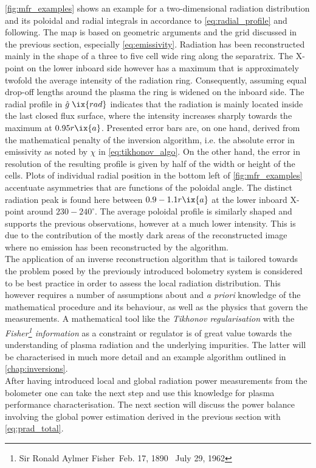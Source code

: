                 \autoref{fig:mfr_examples} shows an example for a two-dimensional radiation distribution and its poloidal and radial integrals in accordance to \cref{eq:radial_profile} and following. The map is based on geometric arguments and the grid discussed in the previous section, especially \cref{eq:emissivity}. Radiation has been reconstructed mainly in the shape of a three to five cell wide ring along the separatrix. The X-point on the lower inboard side however has a maximum that is approximately twofold the average intensity of the radiation ring. Consequently, assuming equal drop-off lengths around the plasma the ring is widened on the inboard side. The radial profile in $\mathrel{\hat{g}}\ix{rad}$ indicates that the radiation is mainly located inside the last closed flux surface, where the intensity increases sharply towards the maximum at $0.95r\ix{a}$. Presented error bars are, on one hand, derived from the mathematical penalty of the inversion algorithm, i.e. the absolute error in emissivity as noted by $\chi$ in \cref{eq:tikhonov_algo}. On the other hand, the error in resolution of the resulting profile is given by half of the width or height of the cells. Plots of individual radial position in the bottom left of \cref{fig:mfr_examples} accentuate asymmetries that are functions of the poloidal angle. The distinct radiation peak is found here between $0.9-1.1r\ix{a}$ at the lower inboard X-point around $230-240^{\circ}$. The average poloidal profile is similarly shaped and supports the previous observations, however at a much lower intensity. This is due to the contribution of the mostly dark areas of the reconstructed image where no emission has been reconstructed by the algorithm.\\%
                The application of an inverse reconstruction algorithm that is tailored towards the problem posed by the previously introduced bolometry system is considered to be best practice in order to assess the local radiation distribution. This however requires a number of assumptions about and \textit{a priori} knowledge of the mathematical procedure and its behaviour, as well as the physics that govern the measurements. A mathematical tool like the \textit{Tikhonov regularisation} with the \textit{Fisher\footnote[1]{Sir Ronald Aylmer Fisher~Feb. 17, 1890 \textdagger~July 29, 1962} information} as a constraint or regulator is of great value towards the understanding of plasma radiation and the underlying impurities. The latter will be characterised in much more detail and an example algorithm outlined in \cref{chap:inversions}.\\%
                \newline%
                After having introduced local and global radiation power measurements from the bolometer one can take the next step and use this knowledge for plasma performance characterisation. The next section will discuss the power balance involving the global power estimation derived in the previous section with \cref{eq:prad_total}.%
%
